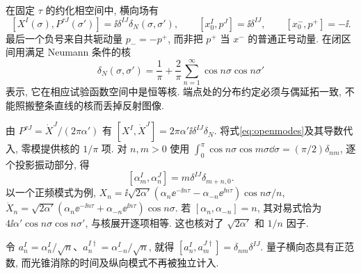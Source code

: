 在固定 $\tau$ 的约化相空间中, 横向场有
\[
 [X^I(\sigma),P^{\tau J}(\sigma')]=\ii\delta^{IJ}\delta_N(\sigma,\sigma'),
 \qquad[x_0^I,p^J]=\ii\delta^{IJ},\qquad[x_0^-,p^+]=-\ii.
\]
最后一个负号来自共轭动量 $p_-=-p^+$, 而非把 $p^+$ 当 $x^-$ 的普通正号动量. 在闭区间用满足 Neumann 条件的核
\[
 \delta_N(\sigma,\sigma')=\frac1\pi+\frac2\pi\sum_{n=1}^\infty
 \cos n\sigma\cos n\sigma'
\]
表示, 它在相应试验函数空间中是恒等核. 端点处的分布约定必须与偶延拓一致, 不能照搬整条直线的核而丢掉反射图像.

由 $P^{\tau J}=\dot X^J/(2\pi\alpha')$ 有
$[X^I,\dot X^J]=2\pi\alpha'\ii\delta^{IJ}\delta_N$.
将式\eqref{eq:openmodes}及其导数代入, 零模提供核的 $1/\pi$ 项. 对 $n,m>0$ 使用
$\int_0^\pi\cos n\sigma\cos m\sigma\dd\sigma=(\pi/2)\delta_{nm}$,
逐个投影振动部分, 得
\[
 [\alpha_m^I,\alpha_n^J]=m\delta^{IJ}\delta_{m+n,0}.
\]
以一个正频模式为例, $X_n=\ii\sqrt{2\alpha'}(\alpha_n\ee^{-\ii n\tau}-\alpha_{-n}\ee^{\ii n\tau})\cos n\sigma/n$,
$\dot X_n=\sqrt{2\alpha'}(\alpha_n\ee^{-\ii n\tau}+\alpha_{-n}\ee^{\ii n\tau})\cos n\sigma$. 若 $[\alpha_n,\alpha_{-n}]=n$, 其对易式恰为 $4\ii\alpha'\cos n\sigma\cos n\sigma'$, 与核展开逐项相等. 这也核对了 $\sqrt{2\alpha'}$ 和 $1/n$ 因子.

令 $a_n^I=\alpha_n^I/\sqrt n$、$a_n^{I\dagger}=\alpha_{-n}^I/\sqrt n$, 就得 $[a_n^I,a_m^{J\dagger}]=\delta_{nm}\delta^{IJ}$. 量子横向态具有正范数, 而光锥消除的时间及纵向模式不再被独立计入.
